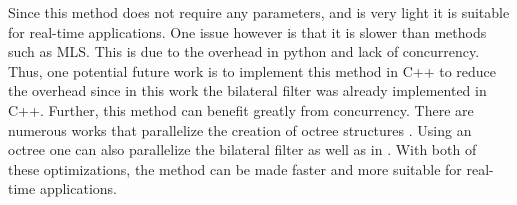 Since this method does not require any parameters, and is very light it is suitable for real-time applications.
One issue however is that it is slower than methods such as MLS. 
This is due to the overhead in python and lack of concurrency.
Thus, one potential future work is to implement this method in C++ to reduce the overhead since in this work the bilateral filter was already implemented in C++.
Further, this method can benefit greatly from concurrency.
There are numerous works that parallelize the creation of octree structures \cite{paralell-octree}. 
Using an octree one can also parallelize the bilateral filter as well as in \cite{3d_bilateral_filter_ipol}.
With both of these optimizations, the method can be made faster and more suitable for real-time applications.
